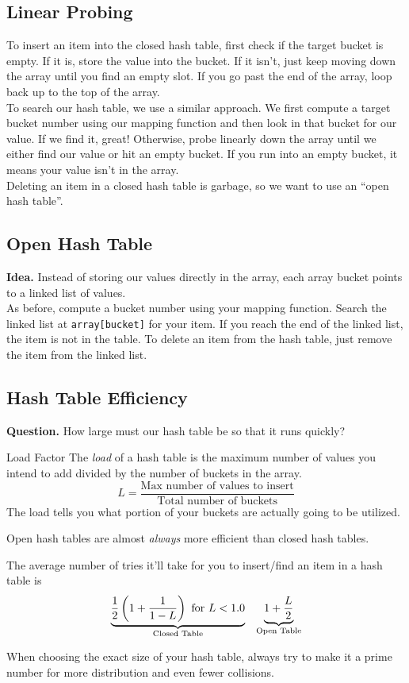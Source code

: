 \documentclass[class=article, crop=false]{standalone}
\begin{document}
  \subsection{Linear Probing}
  To insert an item into the closed hash table, first check if the target bucket is empty. If it is, store the value into the bucket. If it isn't, just keep moving down the array until you find an empty slot. If you go past the end of the array, loop back up to the top of the array. \\[10pt]
  To search our hash table, we use a similar approach. We first compute a target bucket number using our mapping function and then look in that bucket for our value. If we find it, great! Otherwise, probe linearly down the array until we either find our value or hit an empty bucket. If you run into an empty bucket, it means your value isn't in the array. \\[10pt]
  Deleting an item in a closed hash table is garbage, so we want to use an ``open hash table''.
  \subsection{Open Hash Table}
  \textbf{Idea.} Instead of storing our values directly in the array, each array bucket points to a linked list of values. \\[10pt]
  As before, compute a bucket number using your mapping function. Search the linked list at \texttt{array[bucket]} for your item. If you reach the end of the linked list, the item is not in the table. To delete an item from the hash table, just remove the item from the linked list.
  \subsection{Hash Table Efficiency}
  \textbf{Question.} How large must our hash table be so that it runs quickly?
  \begin{definition}{Load Factor}
    The \emph{load} of a hash table is the maximum number of values you intend to add divided by the number of buckets in the array.
    \[
      L = \frac{\text{Max number of values to insert}}{\text{Total number of buckets}}
    \]
    The load tells you what portion of your buckets are actually going to be utilized.
  \end{definition}
  \begin{note}{}
    Open hash tables are almost \emph{always} more efficient than closed hash tables.
  \end{note}
  The average number of tries it'll take for you to insert/find an item in a hash table is
  \begin{align*}
    \underbrace{\frac{1}{2}\left( 1 + \frac{1}{1-L} \right) \text{ for }L < 1.0}_{\text{Closed Table}} && \underbrace{1 + \frac{L}{2}}_{\text{Open Table}}
  \end{align*}
  \begin{note}{}
    When choosing the exact size of your hash table, always try to make it a prime number for more distribution and even fewer collisions.
  \end{note}
\end{document}
